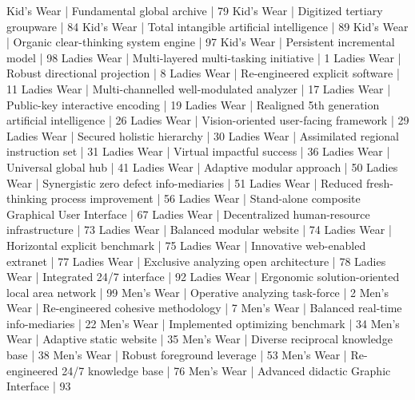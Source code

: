 \begin{pseudo*}
 Kid's Wear  | Fundamental global archive                       |      79
 Kid's Wear  | Digitized tertiary groupware                     |      84
 Kid's Wear  | Total intangible artificial intelligence         |      89
 Kid's Wear  | Organic clear-thinking system engine             |      97
 Kid's Wear  | Persistent incremental model                     |      98
 Ladies Wear | Multi-layered multi-tasking initiative           |       1
 Ladies Wear | Robust directional projection                    |       8
 Ladies Wear | Re-engineered explicit software                  |      11
 Ladies Wear | Multi-channelled well-modulated analyzer         |      17
 Ladies Wear | Public-key interactive encoding                  |      19
 Ladies Wear | Realigned 5th generation artificial intelligence |      26
 Ladies Wear | Vision-oriented user-facing framework            |      29
 Ladies Wear | Secured holistic hierarchy                       |      30
 Ladies Wear | Assimilated regional instruction set             |      31
 Ladies Wear | Virtual impactful success                        |      36
 Ladies Wear | Universal global hub                             |      41
 Ladies Wear | Adaptive modular approach                        |      50
 Ladies Wear | Synergistic zero defect info-mediaries           |      51
 Ladies Wear | Reduced fresh-thinking process improvement       |      56
 Ladies Wear | Stand-alone composite Graphical User Interface   |      67
 Ladies Wear | Decentralized human-resource infrastructure      |      73
 Ladies Wear | Balanced modular website                         |      74
 Ladies Wear | Horizontal explicit benchmark                    |      75
 Ladies Wear | Innovative web-enabled extranet                  |      77
 Ladies Wear | Exclusive analyzing open architecture            |      78
 Ladies Wear | Integrated 24/7 interface                        |      92
 Ladies Wear | Ergonomic solution-oriented local area network   |      99
 Men's Wear  | Operative analyzing task-force                   |       2
 Men's Wear  | Re-engineered cohesive methodology               |       7
 Men's Wear  | Balanced real-time info-mediaries                |      22
 Men's Wear  | Implemented optimizing benchmark                 |      34
 Men's Wear  | Adaptive static website                          |      35
 Men's Wear  | Diverse reciprocal knowledge base                |      38
 Men's Wear  | Robust foreground leverage                       |      53
 Men's Wear  | Re-engineered 24/7 knowledge base                |      76
 Men's Wear  | Advanced didactic Graphic Interface              |      93

\end{pseudo*}
